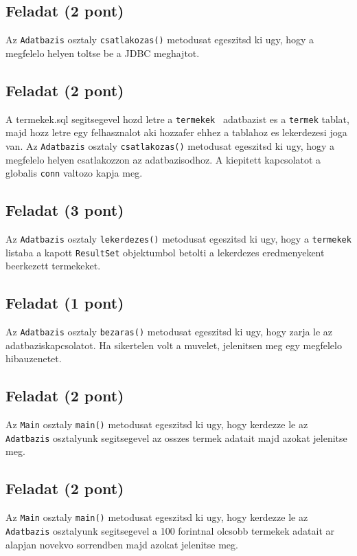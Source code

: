 \documentclass{article}
\let\l\lstinline
\begin{document}
\subsection{Feladat (2 pont)}
Az \lstinline{Adatbazis} osztaly \lstinline{csatlakozas()} metodusat egeszitsd ki ugy, hogy a megfelelo helyen toltse be a JDBC meghajtot.

\subsection{Feladat (2 pont)}

A termekek.sql segitsegevel hozd letre a \l{termekek } adatbazist es a \l{termek} tablat, majd hozz letre egy felhasznalot aki hozzafer ehhez a tablahoz es lekerdezesi joga van.
Az \lstinline{Adatbazis} osztaly \lstinline{csatlakozas()} metodusat egeszitsd ki ugy, hogy a megfelelo helyen csatlakozzon az adatbazisodhoz. A kiepitett kapcsolatot a globalis \l{conn} valtozo kapja meg.

\subsection{Feladat (3 pont)}
Az \lstinline{Adatbazis} osztaly \lstinline{lekerdezes()} metodusat egeszitsd ki ugy, hogy a \l{termekek} listaba a kapott \l{ResultSet} objektumbol betolti a lekerdezes eredmenyekent beerkezett termekeket.

\subsection{Feladat (1 pont)}
Az \lstinline{Adatbazis} osztaly \lstinline{bezaras()} metodusat egeszitsd ki ugy, hogy zarja le az adatbaziskapcsolatot. Ha sikertelen volt a muvelet, jelenitsen meg egy megfelelo hibauzenetet.

\subsection{Feladat (2 pont)}
Az \lstinline{Main} osztaly \lstinline{main()} metodusat egeszitsd ki ugy, hogy kerdezze le az \l{Adatbazis} osztalyunk segitsegevel az osszes termek adatait majd azokat jelenitse meg.

\newpage

\subsection{Feladat (2 pont)}
Az \lstinline{Main} osztaly \lstinline{main()} metodusat egeszitsd ki ugy, hogy kerdezze le az \l{Adatbazis} osztalyunk segitsegevel a 100 forintnal olcsobb termekek adatait ar alapjan novekvo sorrendben majd azokat jelenitse meg.
\end{document}
